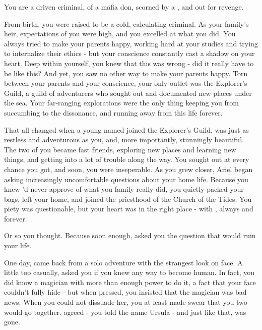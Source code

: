 \documentclass[char]{NeptuneBall}
\begin{document}
\name{\cPriest{}}


You are a driven criminal, \cPriest{\offspring} of a mafia don, scorned by a \cAriel{\prince}, and out for revenge.

From birth, you were raised to be a cold, calculating criminal. As your family's heir, expectations of you were high, and you excelled at what you did. You always tried to make your parents happy, working hard at your studies and trying to internalize their ethics - but your conscience constantly cast a shadow on your heart. Deep within yourself, you knew that this was wrong - did it really have to be like this? And yet, you saw no other way to make your parents happy. Torn between your parents and your conscience, your only outlet was the Explorer's Guild, a guild of adventurers who sought out and documented new places under the sea. Your far-ranging explorations were the only thing keeping you from succumbing to the dissonance, and running away from this life forever.

That all changed when a young \cAriel{\prince} named \cAriel{} joined the Explorer's Guild. \cAriel{\they} was just as restless and adventurous as you, and, more importantly, stunningly beautiful. The two of you became fast friends, exploring new places and learning new things, and getting into a lot of trouble along the way. You sought \cAriel{\them} out at every chance you got, and soon, you were inseperable. As you grew closer, Ariel began asking increasingly uncomfortable questions about your home life. Because you knew \cAriel{\they}'d never approve of what you family really did, you quietly packed your bags, left your home, and joined the priesthood of the Church of the Tides. You piety was questionable, but your heart was in the right place - with \cAriel{}, always and forever.

Or so you thought. Because soon enough, \cAriel{} asked you the question that would ruin your life. 

One day, \cAriel{} came back from a solo adventure with the strangest look on \cAriel{\their} face. A little too casually, \cAriel{\they} asked you if you knew any way to become human. In fact, you did know a magician with more than enough power to do it, a fact that your face couldn't fully hide - but when \cAriel{\they} pressed, you insisted that the magician was bad news. When you could not dissuade her, you at least made \cAriel{\them} swear that you two would go together. \cAriel{\they} agreed - you told \cAriel{\them} the name Ursula - and just like that, \cAriel{\they} was gone. 
\end{document}
